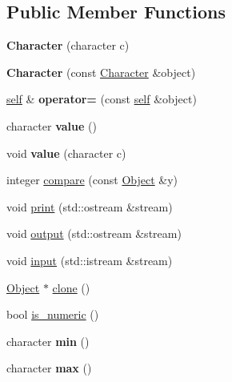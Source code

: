 \subsection*{Public Member Functions}
\begin{DoxyCompactItemize}
\item 
\mbox{\label{classez_1_1objects_1_1Character_a6c31ce83af70a52bc13a082fb52bebb5}} 
{\bfseries Character} (character c)
\item 
\mbox{\label{classez_1_1objects_1_1Character_aeed1a671762a384be0feec2df2e7ba22}} 
{\bfseries Character} (const \hyperlink{classez_1_1objects_1_1Character}{Character} \&object)
\item 
\mbox{\label{classez_1_1objects_1_1Character_abbf053f6036426e1fd2f1f1ab2a2e8e5}} 
\hyperlink{classez_1_1objects_1_1Character}{self} \& {\bfseries operator=} (const \hyperlink{classez_1_1objects_1_1Character}{self} \&object)
\item 
\mbox{\label{classez_1_1objects_1_1Character_a73e6dc5e0dd21806829921636788b53c}} 
character {\bfseries value} ()
\item 
\mbox{\label{classez_1_1objects_1_1Character_a2e3430a7fada6e65312896e78c961c4b}} 
void {\bfseries value} (character c)
\item 
integer \hyperlink{classez_1_1objects_1_1Character_a2e6241f13a2f749e7b1951667b4ec96a}{compare} (const \hyperlink{classez_1_1objects_1_1Object}{Object} \&y)
\item 
void \hyperlink{classez_1_1objects_1_1Character_abf2e9f190594d03005b1cd0610f2f38c}{print} (std\+::ostream \&stream)
\item 
void \hyperlink{classez_1_1objects_1_1Character_ab72c114740fab4824d691d6219e07a67}{output} (std\+::ostream \&stream)
\item 
void \hyperlink{classez_1_1objects_1_1Character_a021f11fd444493316c4d55e6efb031f5}{input} (std\+::istream \&stream)
\item 
\hyperlink{classez_1_1objects_1_1Object}{Object} $\ast$ \hyperlink{classez_1_1objects_1_1Character_ad272c9b94a2d152f0832f2957cfd4e63}{clone} ()
\item 
bool \hyperlink{classez_1_1objects_1_1Character_ae94793b98d9c5a173ba73e110420f187}{is\+\_\+numeric} ()
\item 
\mbox{\label{classez_1_1objects_1_1Character_a34411a36a4631183fa6022dfaca1c599}} 
character {\bfseries min} ()
\item 
\mbox{\label{classez_1_1objects_1_1Character_a82f9484062c83e4ef71411743d2c8b63}} 
character {\bfseries max} ()
\end{DoxyCompactItemize}
